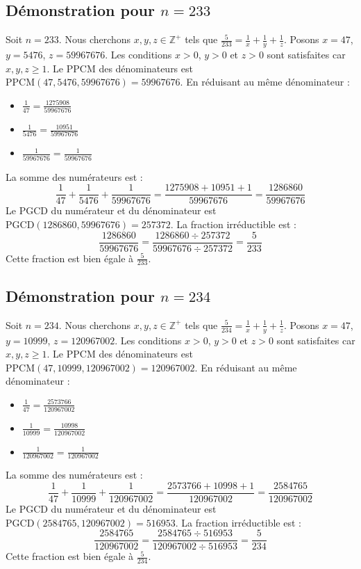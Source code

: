 \documentclass[11pt,a4paper]{article}
\begin{document}
\subsection{Démonstration pour $n = 233$}
Soit $n = 233$. Nous cherchons $x, y, z \in \mathbb{Z}^{+}$ tels que $\frac{5}{233} = \frac{1}{x} + \frac{1}{y} + \frac{1}{z}$.
Posons $x = 47$, $y = 5476$, $z = 59967676$.
Les conditions $x > 0$, $y > 0$ et $z > 0$ sont satisfaites car $x, y, z \geq 1$.
Le PPCM des dénominateurs est $\text{PPCM}(47, 5476, 59967676) = 59967676$.
En réduisant au même dénominateur :
\begin{itemize}
    \item $\frac{1}{47} = \frac{1275908}{59967676}$
    \item $\frac{1}{5476} = \frac{10951}{59967676}$
    \item $\frac{1}{59967676} = \frac{1}{59967676}$
\end{itemize}
La somme des numérateurs est :
$$ \frac{1}{47} + \frac{1}{5476} + \frac{1}{59967676} = \frac{1275908 + 10951 + 1}{59967676} = \frac{1286860}{59967676} $$
Le PGCD du numérateur et du dénominateur est $\text{PGCD}(1286860, 59967676) = 257372$.
La fraction irréductible est :
$$ \frac{1286860}{59967676} = \frac{1286860 \div 257372}{59967676 \div 257372} = \frac{5}{233} $$
Cette fraction est bien égale à $\frac{5}{233}$.

\subsection{Démonstration pour $n = 234$}
Soit $n = 234$. Nous cherchons $x, y, z \in \mathbb{Z}^{+}$ tels que $\frac{5}{234} = \frac{1}{x} + \frac{1}{y} + \frac{1}{z}$.
Posons $x = 47$, $y = 10999$, $z = 120967002$.
Les conditions $x > 0$, $y > 0$ et $z > 0$ sont satisfaites car $x, y, z \geq 1$.
Le PPCM des dénominateurs est $\text{PPCM}(47, 10999, 120967002) = 120967002$.
En réduisant au même dénominateur :
\begin{itemize}
    \item $\frac{1}{47} = \frac{2573766}{120967002}$
    \item $\frac{1}{10999} = \frac{10998}{120967002}$
    \item $\frac{1}{120967002} = \frac{1}{120967002}$
\end{itemize}
La somme des numérateurs est :
$$ \frac{1}{47} + \frac{1}{10999} + \frac{1}{120967002} = \frac{2573766 + 10998 + 1}{120967002} = \frac{2584765}{120967002} $$
Le PGCD du numérateur et du dénominateur est $\text{PGCD}(2584765, 120967002) = 516953$.
La fraction irréductible est :
$$ \frac{2584765}{120967002} = \frac{2584765 \div 516953}{120967002 \div 516953} = \frac{5}{234} $$
Cette fraction est bien égale à $\frac{5}{234}$.
\end{document}
